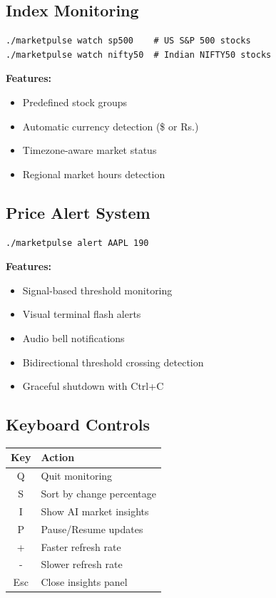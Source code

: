 \documentclass[12pt,a4paper]{article}
\begin{document}
\subsection{Index Monitoring}

\begin{lstlisting}
./marketpulse watch sp500    # US S&P 500 stocks
./marketpulse watch nifty50  # Indian NIFTY50 stocks
\end{lstlisting}

\textbf{Features:}
\begin{itemize}[itemsep=0.3em]
    \item Predefined stock groups
    \item Automatic currency detection (\$ or Rs.)
    \item Timezone-aware market status
    \item Regional market hours detection
\end{itemize}

\subsection{Price Alert System}

\begin{lstlisting}
./marketpulse alert AAPL 190
\end{lstlisting}

\textbf{Features:}
\begin{itemize}[itemsep=0.3em]
    \item Signal-based threshold monitoring
    \item Visual terminal flash alerts
    \item Audio bell notifications
    \item Bidirectional threshold crossing detection
    \item Graceful shutdown with Ctrl+C
\end{itemize}

\subsection{Keyboard Controls}

\begin{tabular}{|c|l|}
\hline
\textbf{Key} & \textbf{Action} \\
\hline
Q & Quit monitoring \\
\hline
S & Sort by change percentage \\
\hline
I & Show AI market insights \\
\hline
P & Pause/Resume updates \\
\hline
+ & Faster refresh rate \\
\hline
- & Slower refresh rate \\
\hline
Esc & Close insights panel \\
\hline
\end{tabular}
\end{document}
